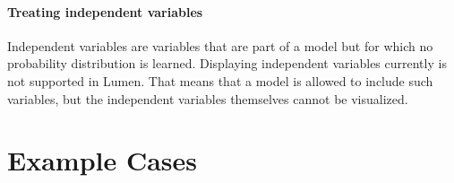 \documentclass{article}
\begin{document}
\paragraph{Treating independent variables}
Independent variables are variables that are part of a model but for which no probability distribution is learned. Displaying independent variables currently is not supported in Lumen. That means that a model is allowed to include such variables, but the independent variables themselves cannot be visualized.



\section{Example Cases}
\end{document}
